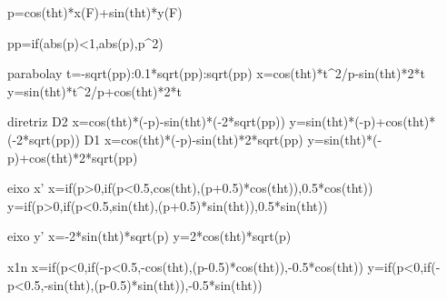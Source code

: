 p=cos(tht)*x(F)+sin(tht)*y(F)

pp=if(abs(p)<1,abs(p),p^2)


parabolay
t=-sqrt(pp):0.1*sqrt(pp):sqrt(pp)
x=cos(tht)*t^2/p-sin(tht)*2*t
y=sin(tht)*t^2/p+cos(tht)*2*t


diretriz
D2
x=cos(tht)*(-p)-sin(tht)*(-2*sqrt(pp))
y=sin(tht)*(-p)+cos(tht)*(-2*sqrt(pp))
D1
x=cos(tht)*(-p)-sin(tht)*2*sqrt(pp)
y=sin(tht)*(-p)+cos(tht)*2*sqrt(pp)


eixo x'
x=if(p>0,if(p<0.5,cos(tht),(p+0.5)*cos(tht)),0.5*cos(tht))
y=if(p>0,if(p<0.5,sin(tht),(p+0.5)*sin(tht)),0.5*sin(tht))


eixo y'
x=-2*sin(tht)*sqrt(p)
y=2*cos(tht)*sqrt(p)

x1n
x=if(p<0,if(-p<0.5,-cos(tht),(p-0.5)*cos(tht)),-0.5*cos(tht))
y=if(p<0,if(-p<0.5,-sin(tht),(p-0.5)*sin(tht)),-0.5*sin(tht))